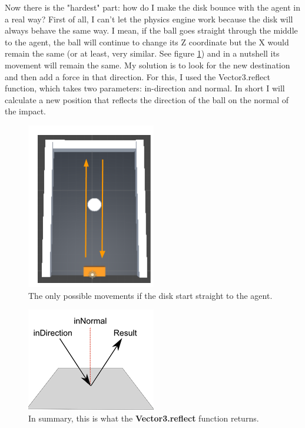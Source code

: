 \documentclass[12pt]{article}
\begin{document}
	\noindent
	Now there is the "hardest" part: how do I make the disk bounce with the agent in a real way?
	First of all, I can't let the physics engine work because the disk will always behave the same way. I mean, if the ball goes straight through the middle to the agent, the ball will continue to change its Z coordinate but the X would remain the same (or at least, very similar. See figure \ref{lbl:mvmupdown}) and in a nutshell its movement will remain the same.
	My solution is to look for the new destination and then add a force in that direction. For this, I used the Vector3.reflect function, which takes two parameters: in-direction and normal. In short I will calculate a new position that reflects the direction of the ball on the normal of the impact.
	
	\newpage
	
	\begin{figure}[hbt!]
		\centering
		\includegraphics[width= 0.4
		\textwidth]{images/FieldmovementUpDown.png}
		\caption{The only possible movements if the disk start straight to the agent.}
		\label{lbl:mvmupdown}
	\end{figure} 

	\begin{figure}[hbt!]
		\centering
		\includegraphics[width= 0.5
		\textwidth]{images/Reflect.png}
		\caption{In summary, this is what the \textbf{Vector3.reflect} function returns.}
		\label{lbl:reflect}
	\end{figure} 
	
\end{document}
